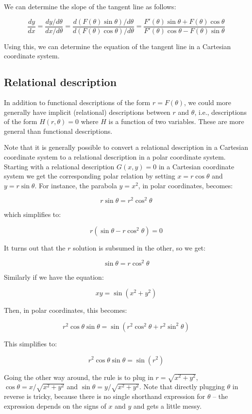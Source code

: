 \documentclass[10pt]{amsart}
\begin{document}
We can determine the slope of the tangent line as follows:

$$\frac{dy}{dx} = \frac{dy/d\theta}{dx/d\theta} = \frac{d(F(\theta)\sin \theta)/d\theta}{d(F(\theta)\cos \theta)/d\theta} = \frac{F'(\theta)\sin \theta + F(\theta)\cos \theta}{F'(\theta) \cos \theta - F(\theta)\sin \theta}$$

Using this, we can determine the equation of the tangent line in a
Cartesian coordinate system.

\subsection{Relational description}

In addition to functional descriptions of the form $r = F(\theta)$, we
could more generally have implicit (relational) descriptions between
$r$ and $\theta$, i.e., descriptions of the form $H(r,\theta) = 0$
where $H$ is a function of two variables. These are more general than
functional descriptions.

Note that it is generally possible to convert a relational description
in a Cartesian coordinate system to a relational description in a
polar coordinate system. Starting with a relational description
$G(x,y) = 0$ in a Cartesian coordinate system we get the corresponding
polar relation by setting $x = r \cos \theta$ and $y = r \sin
\theta$. For instance, the parabola $y = x^2$, in polar coordinates,
becomes:

$$r \sin \theta = r^2 \cos^2 \theta$$

which simplifies to:

$$r(\sin \theta - r\cos^2 \theta) = 0$$

It turns out that the $r$ solution is subsumed in the other, so we get:

$$\sin \theta = r\cos^2 \theta$$

Similarly if we have the equation:

$$xy = \sin(x^2 + y^2)$$

Then, in polar coordinates, this becomes:

$$r^2 \cos \theta \sin \theta = \sin(r^2 \cos^2 \theta + r^2\sin^2\theta)$$

This simplifies to:

$$r^2 \cos \theta \sin \theta = \sin(r^2)$$

Going the other way around, the rule is to plug in $r = \sqrt{x^2 +
y^2}$, $\cos \theta = x/\sqrt{x^2 + y^2}$ and $\sin \theta =
y/\sqrt{x^2 + y^2}$. Note that directly plugging $\theta$ in reverse
is tricky, because there is no single shorthand expression for
$\theta$ -- the expression depends on the signs of $x$ and $y$ and
gets a little messy.
\end{document}
